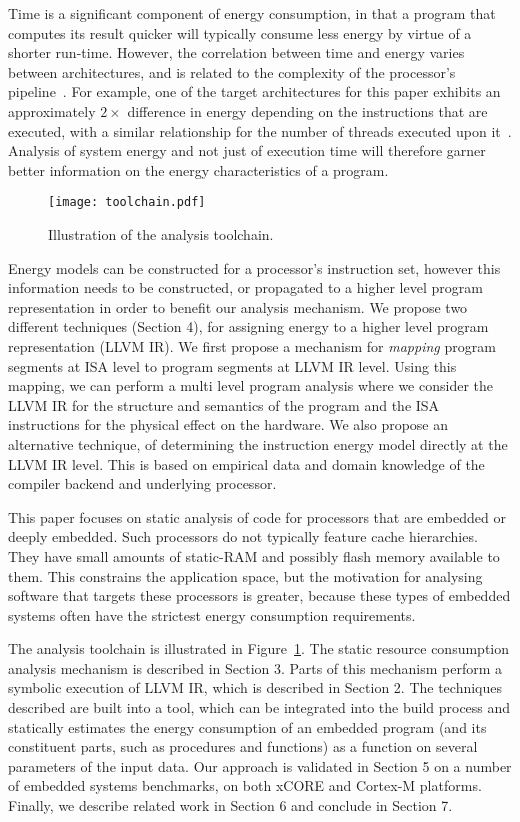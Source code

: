 \documentclass[9pt,preprint]{sigplanconf}
\newcommand{\figlabel}[1]{\label{fig:#1}}
\newcommand{\figref}[1]{Figure~\ref{fig:#1}}
\begin{document}
Time is a significant component of energy consumption, in that a program that
computes its result quicker will typically consume less energy by virtue of a
shorter run-time. However, the correlation between time and energy varies
between architectures, and is related to the complexity of the processor's pipeline~\cite{Pallister2013}.
For example, one of the target architectures for this
paper exhibits an approximately $2\times$ difference in energy depending on the
instructions that are executed, with a similar relationship for the number of
threads executed upon it~\cite{Kerrison13}. Analysis of system energy and not
just of execution time will therefore garner better information on the energy
characteristics of a program.

\begin{figure}[hb]
\centering
\texttt{[image: toolchain.pdf]}
\caption{\figlabel{llvmiranalysis}Illustration of the analysis toolchain.}
\end{figure}

Energy models can be constructed for a processor's instruction set, however this
information needs to be constructed, or propagated to a higher level program
representation in order to benefit our analysis mechanism. We propose two
different techniques (Section 4), for assigning energy to a
higher level program representation (LLVM IR).
We first propose a mechanism for \emph{mapping} program segments at ISA level
to program segments at LLVM IR level. Using this mapping, we can perform a multi
level program analysis where we consider the LLVM IR for the structure and semantics
of the program and the ISA instructions for the physical effect on the
hardware. We also propose an alternative technique, of determining
the instruction energy model directly at the LLVM IR level. This is based on
empirical data and domain knowledge of the compiler backend and underlying processor.

This paper focuses on static analysis of code for processors that are embedded
or deeply embedded. Such processors do not typically feature cache hierarchies.
They have small amounts of static-RAM and possibly flash memory available to
them. This constrains the application space, but the motivation for analysing
software that targets these processors is greater, because these types of
embedded systems often have the strictest energy consumption requirements.

The analysis toolchain is illustrated in \figref{llvmiranalysis}. The static
resource consumption analysis mechanism is described in Section 3. Parts of this mechanism
perform a symbolic execution of LLVM IR, which is described in Section 2. The
techniques described are built into a tool, which can be integrated into the
build process and statically estimates the energy consumption of an embedded
program (and its constituent parts, such as procedures and functions) as a
function on several parameters of the input data. Our approach is validated in
Section 5 on a number of embedded systems benchmarks, on both xCORE and Cortex-M
platforms. Finally, we describe related work in Section 6 and conclude in
Section 7.
\end{document}
